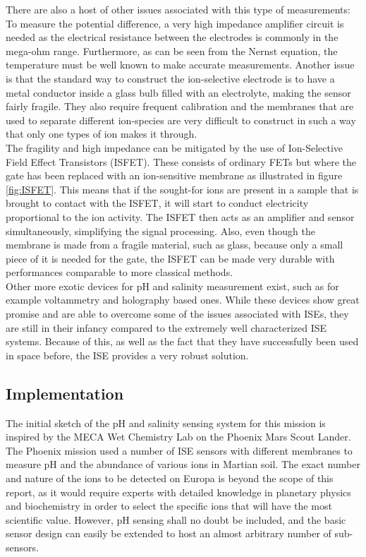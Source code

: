 \noindent
There are also a host of other issues associated with this type of measurements: To measure the potential difference, a very high impedance amplifier circuit is needed as the electrical resistance between the electrodes is commonly in the mega-ohm range\cite{website:ph3}. Furthermore, as can be seen from the Nernst equation, the temperature must be well known to make accurate measurements. Another issue is that the standard way to construct the ion-selective electrode is to have a metal conductor inside a glass bulb filled with an electrolyte, making the sensor fairly fragile. They also require frequent calibration and the membranes that are used to separate different ion-species are very difficult to construct in such a way that only one types of ion makes it through\cite{website:ph1}.\\

\noindent
The fragility and high impedance can be mitigated by the use of Ion-Selective Field Effect Transistors (ISFET). These consists of ordinary FETs but where the gate has been replaced with an ion-sensitive membrane as illustrated in figure \ref{fig:ISFET}. This means that if the sought-for ions are present in a sample that is brought to contact with the ISFET, it will start to conduct electricity proportional to the ion activity. The ISFET then acts as an amplifier and sensor simultaneously, simplifying the signal processing\cite{website:ph4}. Also, even though the membrane is made from a fragile material, such as glass, because only a small piece of it is needed for the gate, the ISFET can be made very durable with performances comparable to more classical methods\cite{website:ph4}. \\ 

\noindent
Other more exotic devices for pH and salinity measurement exist, such as for example voltammetry\cite{website:senova} and holography\cite{article:marshall2003a} based ones. While these devices show great promise and are able to overcome some of the issues associated with ISEs, they are still in their infancy compared to the extremely well characterized ISE systems. Because of this, as well as the fact that they have successfully been used in space before\cite{article:jgre2487}, the ISE provides a very robust solution.

\subsection{Implementation}
The initial sketch of the pH and salinity sensing system for this mission is inspired by the MECA Wet Chemistry Lab on the Phoenix Mars Scout Lander. The Phoenix mission used a number of ISE sensors with different membranes to measure pH and the abundance of various ions in Martian soil\cite{article:jgre2487}. The exact number and nature of the ions to be detected on Europa is beyond the scope of this report, as it would require experts with detailed knowledge in planetary physics and biochemistry in order to select the specific ions that will have the most scientific value. However, pH sensing shall no doubt be included, and the basic sensor design can easily be extended to host an almost arbitrary number of sub-sensors.\\

